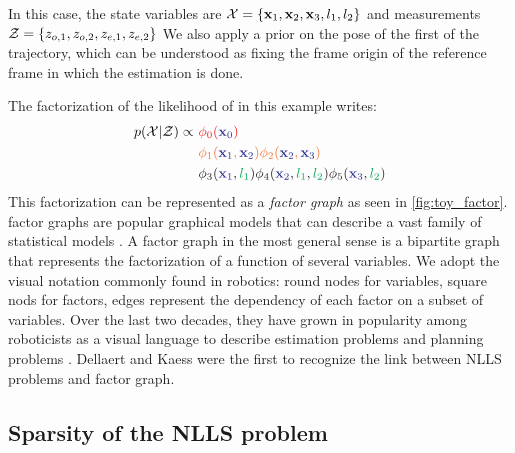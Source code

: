 In this case, the state variables are $\mathcal{X} = \{ {\bf x}_1, {\bf x}_2, {\bf x}_3, l_1, l_2\}$ 
and measurements $\mathcal{Z} = \{ z_{o,1}, z_{o,2}, z_{e,1}, z_{e,2}\}$
We also apply a prior on the pose of the first \keyframe of the trajectory, which can be understood as fixing the frame origin of the reference 
frame in which the estimation is done.

The factorization of the likelihood of  in this example writes:
%
\begin{align}
    p(\cX | \cZ) \propto 
    ~&{\color{Red} \phi_0({\color{Blue} \bfx_{0}})} \\ 
    ~&{\color{Orange} \phi_1({\color{Blue} \bfx_1}, {\color{Blue} \bfx_2}) \phi_2({\color{Blue} \bfx_2}, {\color{Blue} \bfx_3})} \\ 
    ~&{\color{Black} \phi_3({\color{Blue} \bfx_1}, {\color{Green} l_1}) \phi_4({\color{Blue} \bfx_2}, {\color{Green} l_1}, {\color{Green} l_2}) \phi_5({\color{Blue} \bfx_3}, {\color{Green} l_2})} \\ 
\end{align}
%
This factorization can be represented as a \textit{factor graph} as seen in \ref{fig:toy_factor}. 
factor graphs are popular graphical models \cite{koller2009probabilistic} that can describe a vast family of statistical models \cite{loeliger2004introduction}.
A factor graph in the most general sense is a bipartite graph that represents the factorization of a function of several variables. 
We adopt the visual notation commonly found in robotics: round nodes for variables, square nods for factors, edges represent the dependency 
of each factor on a subset of variables. Over the last two decades, they have grown in popularity among roboticists as a visual language to describe 
estimation problems \cite{dellaert2017factor} and planning problems \cite{dong2016motion}. Dellaert and Kaess \cite{dellaert2006square} were the first to
recognize the link between NLLS problems and factor graph.


\subsection{Sparsity of the NLLS problem}


